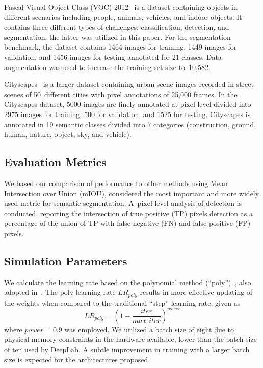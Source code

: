 \documentclass[sensors,article,accept,moreauthors,pdftex]{Definitions/mdpi}
\begin{document}
Pascal Visual Object Class (VOC) 2012~\cite{Pascal} is a dataset containing objects in different scenarios including people, animals, vehicles, and indoor objects. It contains three different types of challenges: classification, detection, and segmentation; the latter was utilized in this paper. For the segmentation benchmark, the dataset contains 1464 images for training, 1449 images for validation, and 1456 images for testing annotated for 21 classes. Data augmentation was used to increase the training set size to~10,582.

Cityscapes~\cite{Cityscapes} is a larger dataset containing urban scene images recorded in street scenes of 50~different cities with pixel annotations of 25,000 frames.
In the Cityscapes dataset, 5000 images are finely annotated at pixel level divided into 2975 images for training, 500 for validation, and 1525 for testing. Cityscapes is annotated in 19 semantic classes divided into 7 categories (construction, ground, human, nature, object, sky, and vehicle).

\subsection{Evaluation Metrics}
We based our comparison of performance to other methods using Mean Intersection over Union (mIOU), considered the most important and more widely used metric for semantic segmentation. A~pixel-level analysis of detection is conducted, reporting the intersection of true positive (TP) pixels detection as a percentage of the union of TP with false negative (FN) and false positive (FP) pixels.

\subsection{Simulation Parameters}
We calculate the learning rate based on the polynomial method (``poly'')~\cite{Parsenet}, also adopted in~\cite{DeepLab}. The poly learning rate $LR_{poly}$ results in more effective updating of the weights when compared to the traditional ``step'' learning rate, given as
\begin{equation}
LR_{poly}=(1-\frac{iter}{max\_iter})^{power}
\end{equation}
where $power\!=\!0.9$ was employed.
We utilized a batch size of eight due to physical memory constraints in the hardware available, lower than the batch size of ten used by DeepLab. A subtle improvement in training with a larger batch size is expected for the architectures proposed.
\end{document}
